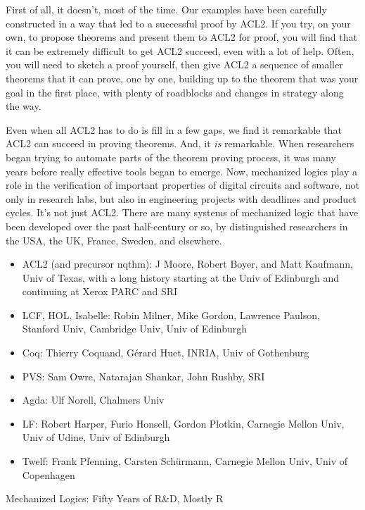 First of all, it doesn't, most of the time.
Our examples have been carefully constructed in a way that
led to a successful proof by ACL2.
If you try, on your own, to propose theorems
and present them to ACL2 for proof, you will find that it can be
extremely difficult to get ACL2 succeed, even with a lot of help.
Often, you will need to sketch a proof yourself,
then give ACL2 a sequence of smaller theorems
that it can prove, one by one, building up to
the theorem that was your goal in the first place,
with plenty of roadblocks and changes in strategy along the way.

Even when all ACL2 has to do is fill in a few gaps,
we find it remarkable that ACL2 can succeed in proving theorems.
And, it \emph{is} remarkable.
When researchers began trying to automate parts
of the theorem proving process, it was many years
before really effective tools began to emerge.
Now, mechanized logics play a role in
the verification of important properties of digital circuits and
software, not only in research labs,
but also in engineering projects with deadlines and product cycles.
It's not just ACL2. There are many systems of mechanized logic that
have been developed over the past half-century or so,
by distinguished researchers in the USA, the UK, France, Sweden, and elsewhere.

\begin{aside}
\begin{itemize}
\item ACL2 (and precursor nqthm): J Moore, Robert Boyer, and Matt Kaufmann, Univ of Texas, with a long history starting at the Univ of Edinburgh and continuing at Xerox PARC and SRI
\item LCF, HOL, Isabelle: Robin Milner, Mike Gordon, Lawrence Paulson, Stanford Univ, Cambridge Univ, Univ of Edinburgh
\item Coq: Thierry Coquand, G\'erard Huet, INRIA, Univ of Gothenburg
\item PVS: Sam Owre, Natarajan Shankar, John Rushby, SRI
\item Agda: Ulf Norell, Chalmers Univ
\item LF: Robert Harper, Furio Honsell, Gordon Plotkin, Carnegie Mellon Univ, Univ of Udine, Univ of Edinburgh
\item Twelf: Frank Pfenning, Carsten Sch\"urmann, Carnegie Mellon Univ, Univ of Copenhagen
\end{itemize}
\caption{Mechanized Logics: Fifty Years of R\&D, Mostly R}
\label{mechanized-logic-history}
\end{aside}

